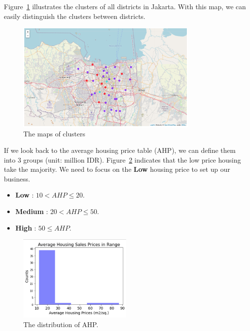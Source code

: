 \documentclass[12pt,a4paper]{article}
\begin{document}
\clearpage

Figure~\ref{fig:cluster_map} illustrates the clusters of all districts in Jakarta. With this map, we can easily distinguish the clusters between districts.

\begin{center}
    \begin{figure}[htp]
    \begin{center}
     \includegraphics[width=0.8\textwidth]{fig/cluster_map}
    \end{center}
    \caption{The maps of clusters}
    \label{fig:cluster_map}
    \end{figure}
\end{center}

If we look back to the average housing price table (AHP), we can define them into 3 groups (unit: million IDR). Figure~\ref{fig:ahp} indicates that the low price housing take the majority. We need to focus on the \textbf{Low} housing price to set up our business.

\begin{itemize}
\item \textbf{Low} : $10 < AHP \le 20$.
\item \textbf{Medium} : $20 < AHP \le 50$.
\item \textbf{High} : $50 \le AHP$.
\end{itemize}

\begin{center}
    \begin{figure}[htp]
    \begin{center}
     \includegraphics[width=0.5\textwidth]{fig/ahp}
    \end{center}
    \caption{The distribution of AHP.}
    \label{fig:ahp}
    \end{figure}
\end{center}
\end{document}
